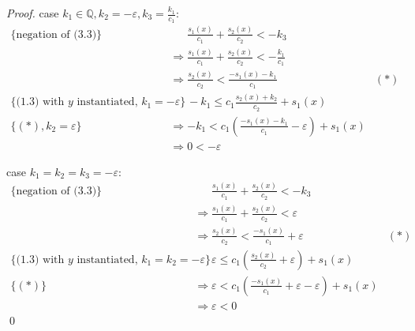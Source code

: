 \documentclass{llncs}
\begin{document}
\begin{proof}
case $k_1\in \mathbb{Q}, k_2=-\varepsilon,  k_3 = \frac{k_1}{c_1}$:
\begin{align*}
  \text{\{negation of (3.3)\}} & \phantom{\Rightarrow} \frac{s_1(x)}{c_1} + \frac{s_2(x)}{c_2} 
  < - k_3 \\
  & \Rightarrow \frac{s_1(x)}{c_1} + \frac{s_2(x)}{c_2} 
  < - \frac{k_1}{c_1} \\
  & \Rightarrow \frac{s_2(x)}{c_2} < \frac{-s_1(x)-k_1}{c_1} & (*) \\
  \text{\{(1.3) with $y$ instantiated, $k_1=-\varepsilon$\}} & 
  \phantom{\Rightarrow} -k_1 \leq c_1 \frac{s_2(x)+k_2}{c_2}  + s_1(x) \\
  \text{\{$(*),k_2=\varepsilon$\}} & 
  \Rightarrow -k_1 < c_1 (\frac{-s_1(x)-k_1}{c_1}-\varepsilon) + s_1(x) \\
  &\Rightarrow 0<-\varepsilon
\end{align*}

case $k_1=k_2=k_3=-\varepsilon$:
\begin{align*}
  \text{\{negation of (3.3)\}} & \phantom{\Rightarrow} \frac{s_1(x)}{c_1} + \frac{s_2(x)}{c_2} 
  < - k_3 \\
  & \Rightarrow \frac{s_1(x)}{c_1} + \frac{s_2(x)}{c_2} < \varepsilon \\
  & \Rightarrow \frac{s_2(x)}{c_2} < \frac{-s_1(x)}{c_1} + \varepsilon & (*) \\
  \text{\{(1.3) with $y$ instantiated, $k_1=k_2=-\varepsilon$\}} & 
  \phantom{\Rightarrow} \varepsilon \leq c_1 (\frac{s_2(x)}{c_2}+\varepsilon)  + s_1(x) \\
  \text{\{$(*)$\}} & 
  \Rightarrow \varepsilon < c_1 (\frac{-s_1(x)}{c_1} + \varepsilon - \varepsilon) + s_1(x) \\
  &\Rightarrow \varepsilon<0
\end{align*}
\phantom{phantom}
\qed
\end{proof}
\end{document}
